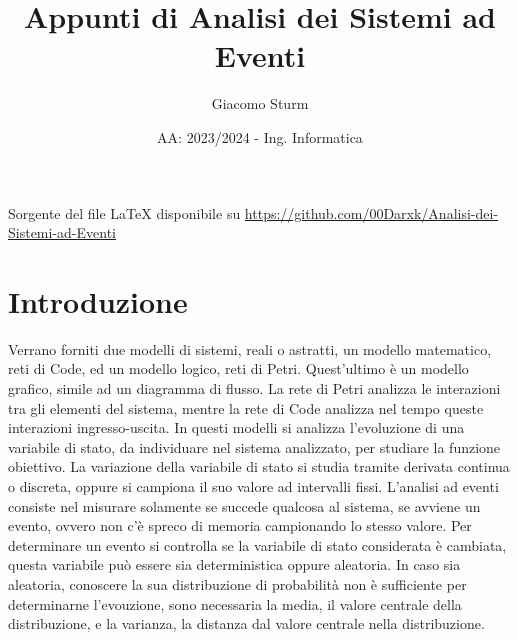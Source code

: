 \documentclass{article}
\title{Appunti di Analisi dei Sistemi ad Eventi}
\author{Giacomo Sturm}
\date{AA: 2023/2024 - Ing. Informatica}
\numberwithin{equation}{subsection}
\begin{document}
\maketitle

\vspace{10mm}

\begin{center}
    Sorgente del file LaTeX disponibile su \url{https://github.com/00Darxk/Analisi-dei-Sistemi-ad-Eventi}
\end{center}

\clearpage

\tableofcontents

\clearpage

\section{Introduzione}

Verrano forniti due modelli di sistemi, reali o astratti, un modello matematico, reti di Code, ed un modello logico, reti di Petri. Quest'ultimo è un modello grafico, simile ad 
un diagramma di flusso. La rete di Petri analizza le interazioni tra gli elementi del sistema, mentre la rete di Code analizza nel tempo queste interazioni ingresso-uscita. 
In questi modelli si analizza l'evoluzione di una variabile di stato, da individuare nel sistema analizzato, per studiare la funzione obiettivo. La variazione della variabile 
di stato si studia tramite derivata continua o discreta, oppure si campiona il suo valore ad intervalli fissi. L'analisi ad eventi consiste nel misurare solamente se succede 
qualcosa al sistema, se avviene un evento, ovvero non c'è spreco di memoria campionando lo stesso valore. Per determinare un evento si controlla se la variabile di stato 
considerata è cambiata, questa variabile può essere sia deterministica oppure aleatoria. In caso sia aleatoria, conoscere la sua distribuzione di probabilità non è sufficiente 
per determinarne l'evouzione, sono necessaria la media, il valore centrale della distribuzione, e la varianza, la distanza dal valore centrale nella distribuzione. 
\end{document}
